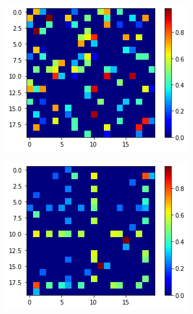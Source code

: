 \documentclass[journal]{IEEEtran}
\theoremstyle{definition}
\theoremstyle{remark}
\begin{document}
\begin{figure}[h!]
  \centering
  \begin{subfigure}[b]{0.4\linewidth}
    \includegraphics[width=\linewidth]{pictures/gt_A_heatmap.png}
  \end{subfigure}
  \begin{subfigure}[b]{0.4\linewidth}
    \includegraphics[width=\linewidth]{pictures/est_A_heatmap.png}
  \end{subfigure}
  \label{fig:heatmap}
\end{figure}
\end{document}
